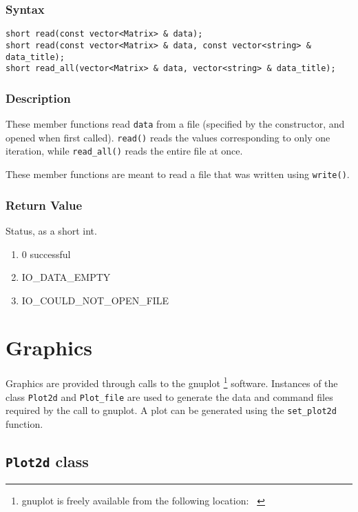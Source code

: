 \documentclass[dvips,11pt,fleqn]{report}
\begin{document}
\subsubsection*{Syntax}
\begin{verbatim}
short read(const vector<Matrix> & data);
short read(const vector<Matrix> & data, const vector<string> & data_title);
short read_all(vector<Matrix> & data, vector<string> & data_title);
\end{verbatim}

\subsubsection*{Description}   
These member functions read \texttt{data} from a file (specified by
the constructor, and opened when first called). \texttt{read()} reads
the values corresponding to only one iteration, while
\texttt{read\_all()} reads the entire file at once.

\noindent
These member functions are meant to read a file that was written using
\texttt{write()}.

\subsubsection*{Return Value}
Status, as a short int.
\begin{enumerate}
\item[] 0 successful
\item[] IO\_DATA\_EMPTY
\item[] IO\_COULD\_NOT\_OPEN\_FILE
\end{enumerate}

\newpage 

\section{Graphics}

Graphics are provided through calls to the \textsf{gnuplot} \footnote{
  \textsf{gnuplot} is freely available from the following location:
  {\tt
    }
  } software. Instances of the class {\tt Plot2d} and {\tt Plot\_file} are used 
to generate the data and command files required by the call to \textsf{gnuplot}. 
A plot can be generated using the \texttt{set\_plot2d} function.
\newpage 

\subsection*{\texttt{Plot2d} class}
\end{document}

